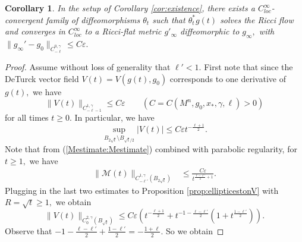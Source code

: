 \documentclass[12pt]{amsart}
\newcommand{\calM}{\mathcal{M}}
\newcommand{\N}{{\mathbb N}}
\renewcommand{\1}{{\mathbf 1}}
\newcommand{\eps}{{\varepsilon}}
\newtheorem{cor}[thm]{Corollary}
\theoremstyle{others}
\numberwithin{equation}{section}
\begin{document}
    \begin{cor}\label{cor:Ricciexistence}
In the setup of Corollary \ref{cor:existence}, there exists a $C^\infty_{loc}$-convergent family of diffeomorphisms $\theta_t$ such that $\theta_t^*g(t)$ solves the Ricci flow and converges in $C^\infty_{loc}$ to a Ricci-flat metric $g'_\infty$ diffeomorphic to $g_\infty,$ with 
$\|g_\infty' - g_0 \|_{C^{0,\gamma}_{-\ell}} \leq C \eps.$ %
\end{cor}
\begin{proof} Assume without loss of generality that $\ell' < 1.$ %
First note that since the DeTurck vector field $V(t) = V(g(t), g_0)$ corresponds to one derivative of $g(t),$ we have
\begin{equation}\label{Vgeneraltestimate}
    \|V(t)\|_{C^{1,\gamma}_{-\ell - 1}} \leq C \eps
    \qquad (C = C(M^n, g_0, x_*, \gamma, \ell) > 0)
\end{equation}
for all times $t \geq 0.$ In particular, we have
\begin{equation*}
\sup_{B_{2\sqrt{t}} \setminus B_{\sqrt{t}/2}} |V(t)| \leq  C \eps t^{- \frac{\ell + 1}{2}}.
\end{equation*}
Note that from (\ref{Mestimate:Mestimate}) combined with parabolic regularity, %
for $t \geq 1,$ we have
\begin{equation*}
\begin{split}
\|\calM(t) \|_{C^{1, \gamma}_{-\ell'}(B_{2\sqrt{t}} )} & \leq \frac{C\eps}{t^{\frac{\ell - \ell'}{2} + 1}}.
\end{split}
\end{equation*}
Plugging in the last two estimates to Proposition \ref{prop:ellipticestonV} with $R = \sqrt{t} \geq 1,$ we obtain
\begin{equation*}
    \|V(t) \|_{C^{2,\gamma}_0(B_{\sqrt{t}})} \leq C \eps \left( t^{- \frac{\ell + 1}{2}} + t^{-1 - \frac{\ell - \ell'}{2}} \left( 1 + t^{\frac{1 - \ell'}{2}} \right) \right).
\end{equation*}
Observe that $-1 - \frac{\ell  - \ell'}{2} + \frac{1 - \ell'}{2} = - \frac{1 + \ell}{2}.$ So we obtain

\end{proof}
\end{document}
